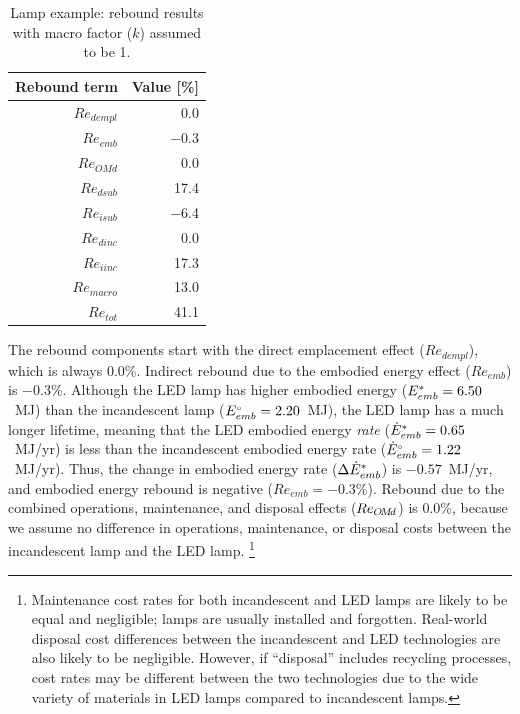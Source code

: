\documentclass[12pt]{article}\usepackage[]{graphicx}\usepackage[]{xcolor}
\begin{document}
\begin{table}[ht]
\centering
\caption{Lamp example: rebound results with macro factor ($k$) assumed to be 1.} 
\label{tab:lamp_results}
\begingroup\footnotesize
\begin{tabular}{rr}
  \toprule
Rebound term & Value [\%] \\ 
  \midrule
$Re_{dempl}$ & 0.0 \\ 
  $Re_{emb}$ & $-$0.3 \\ 
  $Re_{O\!M\!d}$ & 0.0 \\ 
  $Re_{dsub}$ & 17.4 \\ 
  $Re_{isub}$ & $-$6.4 \\ 
  $Re_{dinc}$ & 0.0 \\ 
  $Re_{iinc}$ & 17.3 \\ 
  $Re_{macro}$ & 13.0 \\ 
   \midrule
$Re_{tot}$ & 41.1 \\ 
   \bottomrule
\end{tabular}
\endgroup
\end{table}






The \empleffect{} rebound components start with
the direct emplacement effect ($Re_{dempl}$),
which is always $0.0$\%.
Indirect rebound due to the embodied energy effect
($Re_{emb}$) is $-0.3$\%.
Although the LED lamp has higher embodied energy
(${E}^*_{emb} = 6.50$~MJ)
than the incandescent lamp
(${}{E}^{\scriptscriptstyle \circ}_{emb} = 2.20$~MJ),
the LED lamp has a much longer lifetime,
meaning that the LED embodied energy \emph{rate}
(${\dot{E}}^*_{emb} = 0.65$~MJ/yr)
is less than the incandescent embodied energy rate
(${}{\dot{E}}^{\scriptscriptstyle \circ}_{emb} = 1.22$~MJ/yr).
Thus, the change in embodied energy rate ($\Delta {\dot{E}}^*_{emb}$)
is $-0.57$~MJ/yr,
and embodied energy rebound is negative
($Re_{emb} = -0.3$\%).
Rebound due to the combined operations, maintenance, and disposal effects
($Re_{O\!M\!d}$) is 0.0\%,
because we assume no difference in operations, maintenance, or
disposal costs between
the incandescent lamp and the LED lamp.%
\footnote{
  Maintenance cost rates for both incandescent and LED lamps are likely to be equal
  and negligible;
  lamps are usually installed and forgotten.
  Real-world disposal cost differences between the incandescent and LED technologies
  are also likely to be negligible.
  However, if ``disposal'' includes recycling processes,
  cost rates may be different between the two technologies
  due to the wide variety of materials in LED lamps compared to incandescent lamps.
}
\end{document}
